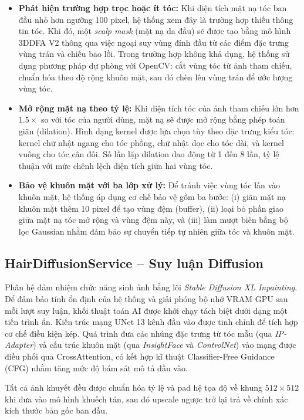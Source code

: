 \documentclass[../main.tex]{subfiles}
\begin{document}
\begin{itemize}
    \item \textbf{Phát hiện trường hợp trọc hoặc ít tóc:} Khi diện tích mặt nạ tóc ban đầu nhỏ hơn ngưỡng 100 pixel, hệ thống xem đây là trường hợp thiếu thông tin tóc. Khi đó, một \textit{scalp mask} (mặt nạ da đầu) sẽ được tạo bằng mô hình 3DDFA V2 thông qua việc ngoại suy vùng đỉnh đầu từ các điểm đặc trưng vùng trán và chiếu bao lồi. Trong trường hợp không khả dụng, hệ thống sử dụng phương pháp dự phòng với OpenCV: cắt vùng tóc từ ảnh tham chiếu, chuẩn hóa theo độ rộng khuôn mặt, sau đó chèn lên vùng trán để ước lượng vùng tóc.
    
    \item \textbf{Mở rộng mặt nạ theo tỷ lệ:} Khi diện tích tóc của ảnh tham chiếu lớn hơn $1.5 \times$ so với tóc của người dùng, mặt nạ sẽ được mở rộng bằng phép toán giãn (dilation). Hình dạng kernel được lựa chọn tùy theo đặc trưng kiểu tóc: kernel chữ nhật ngang cho tóc phồng, chữ nhật dọc cho tóc dài, và kernel vuông cho tóc cân đối. Số lần lặp dilation dao động từ 1 đến 8 lần, tỷ lệ thuận với mức chênh lệch diện tích giữa hai vùng tóc.
    
    \item \textbf{Bảo vệ khuôn mặt với ba lớp xử lý:} Để tránh việc vùng tóc lấn vào khuôn mặt, hệ thống áp dụng cơ chế bảo vệ gồm ba bước: (i) giãn mặt nạ khuôn mặt thêm 10 pixel để tạo vùng đệm (buffer), (ii) loại bỏ phần giao giữa mặt nạ tóc mở rộng và vùng đệm này, và (iii) làm mượt biên bằng bộ lọc Gaussian nhằm đảm bảo sự chuyển tiếp tự nhiên giữa tóc và khuôn mặt.
\end{itemize}

\subsection{HairDiffusionService -- Suy luận Diffusion}
Phân hệ đảm nhiệm chức năng sinh ảnh bằng lõi \textit{Stable Diffusion XL Inpainting}. Để đảm bảo tính ổn định của hệ thống và giải phóng bộ nhớ VRAM GPU sau mỗi lượt suy luận, khối thuật toán AI được khởi chạy tách biệt dưới dạng một tiến trình ẩn. Kiến trúc mạng UNet 13 kênh đầu vào được tinh chỉnh để tích hợp cơ chế điều kiện kép. Quá trình đưa các nhúng đặc trưng từ tóc mẫu (qua \textit{IP-Adapter}) và cấu trúc khuôn mặt (qua \textit{InsightFace} và \textit{ControlNet}) vào mạng được điều phối qua CrossAttention, có kết hợp kĩ thuật Classifier-Free Guidance (CFG) nhằm tăng mức độ bám sát mô tả đầu vào.

Tất cả ảnh khuyết đều được chuẩn hóa tỷ lệ và pad hệ tọa độ về khung $512 \times 512$ khi đưa vào mô hình khuếch tán, sau đó upscale ngược trở lại trả về chính xác kích thước bản gốc ban đầu.
\end{document}
